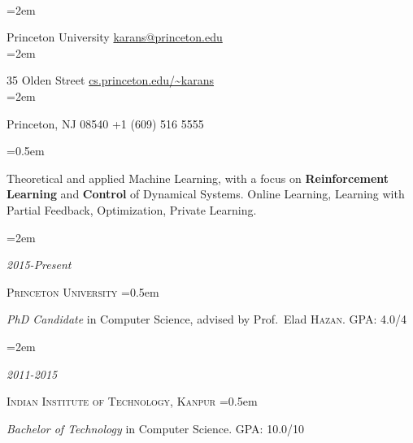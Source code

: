 \documentclass{scrartcl}
\date{}
\newlength{\datebox}\settowidth{\datebox}{Spring 2011} %
\newcommand{\NewEntry}[3]{\noindent\hangindent=2em\hangafter=0 \parbox{\datebox}{\small \textit{#1}}\hspace{1.5em} #2 #3 %
\vspace{0.5em}} %
\newcommand{\Description}[1]{\hangindent=0.5em\hangafter=0\noindent\raggedright\footnotesize{#1}\par\normalsize\vspace{1em}} %
\newcommand{\IndentLine}{\hangindent=2em\hangafter=0\noindent\raggedright}
\begin{document}
\thispagestyle{empty} %

\begin{cv}{}\vspace{1.5em} %

\hspace{-3.0em}\noindent{}
{\small
\\ %
{\IndentLine Princeton University \hfill \Letter\href{mailto:karans@princeton.edu}{karans@princeton.edu}\\ \IndentLine 35 Olden Street \hfill \Mundus\href{http://cs.princeton.edu/~karans}{cs.princeton.edu/\textasciitilde karans} \\
\IndentLine Princeton, NJ 08540 \hfill \Mobilefone +1 (609) 516 5555\\}}

\vspace{0.5em} 

\noindent{}

\Description{Theoretical and applied Machine Learning, with a focus on \textbf {Reinforcement Learning} and \textbf{Control} of Dynamical Systems. Online Learning, Learning with Partial Feedback, Optimization, Private Learning. }



\NewEntry{2015-Present}{\textsc{\color{Maroon} Princeton University}}

\vspace{-0.4em}\hspace{1.0em}
\Description{ \textit{PhD Candidate} in Computer Science, advised by Prof.~Elad \textsc{Hazan}. \hfill GPA: 4.0/4
}

\vspace{-0.5em}
\NewEntry{2011-2015}{\textsc{\color{Maroon} Indian Institute of Technology, Kanpur}}

\vspace{-0.4em}\hspace{1.0em}
\Description{\textit{Bachelor of Technology} in Computer Science. \hfill GPA: 10.0/10
}


\end{cv}
\end{document}
